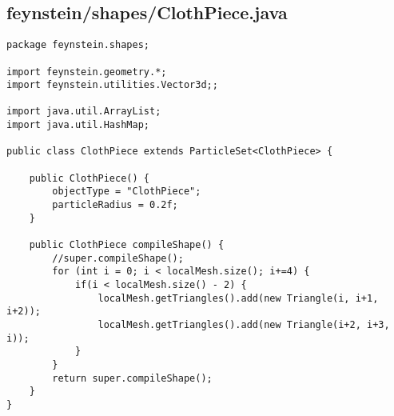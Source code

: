 \subsection*{feynstein/shapes/ClothPiece.java}
\begin{lstlisting}
package feynstein.shapes;

import feynstein.geometry.*;
import feynstein.utilities.Vector3d;;

import java.util.ArrayList;
import java.util.HashMap;

public class ClothPiece extends ParticleSet<ClothPiece> {
	
	public ClothPiece() {
		objectType = "ClothPiece";
		particleRadius = 0.2f;
	}
   	
    public ClothPiece compileShape() {
		//super.compileShape();
		for (int i = 0; i < localMesh.size(); i+=4) {
			if(i < localMesh.size() - 2) {
				localMesh.getTriangles().add(new Triangle(i, i+1, i+2));
				localMesh.getTriangles().add(new Triangle(i+2, i+3, i));
			}
		}
		return super.compileShape();
    }
}\end{lstlisting}

